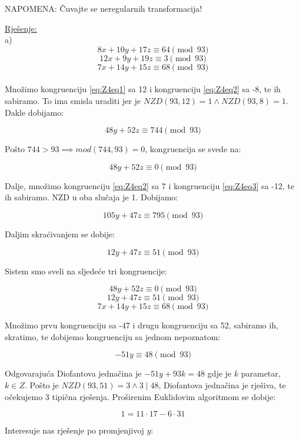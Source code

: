 \documentclass[12pt]{article}
\begin{document}
NAPOMENA: Čuvajte se neregularnih transformacija!

\underline{Rješenje:}\\

a)
\[
8x + 10y + 17z \equiv 64 \pmod{93} \label{eq:Z4eq1} \tag{1}
\]
\[
12x + 9y + 19z \equiv 3 \pmod{93} \label{eq:Z4eq2} \tag{2}
\]
\[
7x + 14y + 15z \equiv 68 \pmod{93} \label{eq:Z4eq3} \tag{3}
\]
\\
Množimo kongruenciju \ref{eq:Z4eq1} sa 12 i kongruenciju \ref{eq:Z4eq2} sa -8, te ih sabiramo. To ima smisla uraditi jer je $NZD(93, 12) = 1 \land NZD(93, 8) = 1$. Dakle dobijamo:

$$48y + 52z \equiv 744 \pmod{93}$$\vspace{1mm}

Pošto $744 > 93 \implies mod(744, 93) = 0$, kongruencija se svede na:

$$48y + 52z \equiv 0 \pmod{93}$$ \vspace{1mm}

Dalje, množimo kongruenciju \ref{eq:Z4eq2} sa 7 i kongruenciju \ref{eq:Z4eq3} sa -12, te ih sabiramo. NZD u oba slučaja je 1. Dobijamo:

$$105y + 47z \equiv 795 \pmod{93}$$\vspace{1mm}

Daljim skraćivanjem se dobije:

$$12y + 47z \equiv 51 \pmod{93}$$\vspace{1mm}

Sistem smo sveli na sljedeće tri kongruencije:

$$48y + 52z \equiv 0 \pmod{93}$$
$$12y + 47z \equiv 51 \pmod{93}$$
$$7x + 14y + 15z \equiv 68 \pmod{93}$$\vspace{1mm}

Množimo prvu kongruenciju sa -47 i drugu kongruenciju sa 52, sabiramo ih, skratimo, te dobijemo kongruenciju sa jednom nepoznatom:

$$-51y \equiv 48 \pmod{93}$$\vspace{1mm}

Odgovarajuća Diofantova jednačina je $-51y + 93k = 48$ gdje je $k$ parametar, $k \in Z$. Pošto je $NZD(93, 51) = 3 \land 3 \mid 48$, Diofantova jednačina je rješiva, te očekujemo 3 tipična rješenja. Proširenim Euklidovim algoritmom se dobije:

$$1 = 11 \cdot 17 - 6 \cdot 31$$\vspace{1mm}

Interesuje nas rješenje po promjenjivoj $y$:
\end{document}
